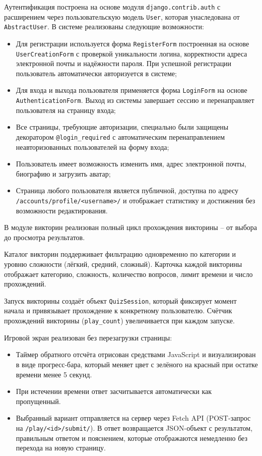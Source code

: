 \documentclass[14pt,a4paper]{extreport}
\begin{document}
Аутентификация построена на основе модуля \texttt{django.contrib.auth} с расширением через пользовательскую модель \texttt{User}, которая унаследована от \texttt{AbstractUser}. В системе реализованы следующие возможности:

\begin{itemize}
    \item Для регистрации используется форма \texttt{RegisterForm} построенная на основе \texttt{UserCreationForm} с проверкой уникальности логина, корректности адреса электронной почты и надёжности пароля. При успешной регистрации пользователь автоматически авторизуется в системе;
    \item Для входа и выхода пользователя применяется форма \texttt{LoginForm} на основе \texttt{AuthenticationForm}. Выход из системы завершает сессию и перенаправляет пользователя на страницу входа;
    \item Все страницы, требующие авторизации, специально были защищены декоратором \texttt{@login\_required} с автоматическим перенаправлением неавторизованных пользователей на форму входа;
    \item Пользователь имеет возможность изменить имя, адрес электронной почты, биографию и загрузить аватар;
    \item Страница любого пользователя является публичной, доступна по адресу \texttt{/accounts/profile/<username>/} и отображает статистику и достижения без возможности редактирования.
\end{itemize}

В модуле викторин реализован полный цикл прохождения викторины -- от выбора до просмотра результатов.

Каталог викторин поддерживает фильтрацию одновременно по категории и уровню сложности (лёгкий, средний, сложный). Карточка каждой викторины отображает категорию, сложность, количество вопросов, лимит времени и число прохождений.

Запуск викторины создаёт объект \texttt{QuizSession}, который фиксирует момент начала и привязывает прохождение к конкретному пользователю. Счётчик прохождений викторины (\texttt{play\_count}) увеличивается при каждом запуске.

Игровой экран реализован без перезагрузки страницы:
\begin{itemize}
    \item Таймер обратного отсчёта отрисован средствами JavaScript и визуализирован в виде прогресс-бара, который меняет цвет с зелёного на красный при остатке времени менее 5 секунд.
    \item При истечении времени ответ засчитывается автоматически как пропущенный.
    \item Выбранный вариант отправляется на сервер через Fetch API (POST-запрос на \texttt{/play/<id>/submit/}). В ответ возвращается JSON-объект с результатом, правильным ответом и пояснением, которые отображаются немедленно без перехода на новую страницу.
\end{itemize}
 
\end{document}
